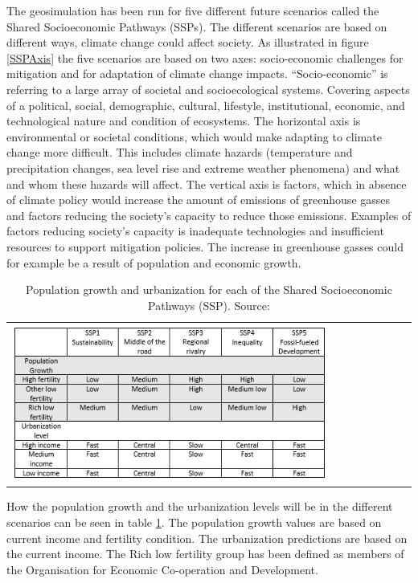 The geosimulation has been run for five different future scenarios called the Shared Socioeconomic Pathways (SSPs). The different scenarios are based on different ways, climate change could affect society. As illustrated in figure \ref{SSPAxis} the five scenarios are based on two axes: socio-economic challenges for mitigation and for adaptation of climate change impacts. 
“Socio-economic” is referring to a large array of societal and socioecological systems. Covering aspects of a political, social, demographic, cultural, lifestyle, institutional, economic, and technological nature and condition of ecosystems. 
The horizontal axis is environmental or societal conditions, which would make adapting to climate change more difficult. This includes climate hazards (temperature and precipitation changes, sea level rise and extreme weather phenomena) and what and whom these hazards will affect.
\citep{ConceptSSP}
The vertical axis is factors, which in absence of climate policy would increase the amount of emissions of greenhouse gasses and factors reducing the society’s capacity to reduce those emissions. Examples of factors reducing society’s capacity is inadequate technologies and insufficient resources to support mitigation policies. The increase in greenhouse gasses could for example be a result of population and economic growth.
\citep{SSP}

\begin{table}[htbp]
	\centering
	\begin{tabular}{l}
		\includegraphics[width=0.8\textwidth]{Pictures/SSPTable}
	\end{tabular}
	\caption{Population growth and urbanization for each of the Shared Socioeconomic Pathways (SSP). Source: \citet{WhyDetailedPop}}
	\label{SSPTable}
\end{table}

How the population growth and the urbanization levels will be in the different scenarios can be seen in table \ref{SSPTable}. The population growth values are based on current income and fertility condition. The urbanization predictions are based on the current income. The Rich low fertility group has been defined as members of the Organisation for Economic Co-operation and Development.


